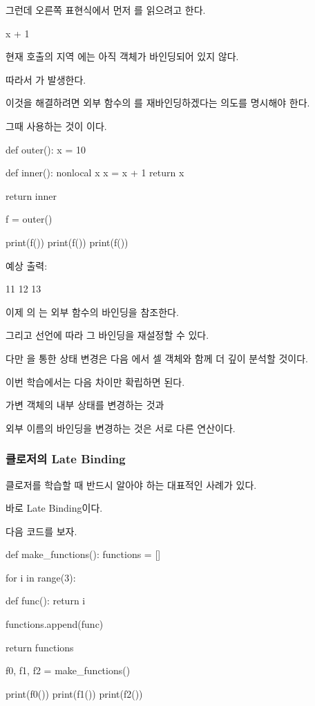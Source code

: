 그런데 오른쪽 표현식에서 먼저 를 읽으려고 한다.

\begin{dhkcode}
x + 1
\end{dhkcode}

현재  호출의 지역 에는 아직 객체가 바인딩되어 있지 않다.

따라서 가 발생한다.

이것을 해결하려면 외부 함수의 를 재바인딩하겠다는 의도를 명시해야 한다.

그때 사용하는 것이 이다.

\begin{dhkcode}
def outer():
    x = 10

    def inner():
        nonlocal x
        x = x + 1
        return x

    return inner


f = outer()

print(f())
print(f())
print(f())
\end{dhkcode}

예상 출력:

\begin{dhkzsh}
11
12
13
\end{dhkzsh}

이제 의 는 외부 함수의 바인딩을 참조한다.

그리고  선언에 따라 그 바인딩을 재설정할 수 있다.

다만 을 통한 상태 변경은 다음 에서 셀 객체와 함께 더 깊이 분석할 것이다.

이번 학습에서는 다음 차이만 확립하면 된다.

\begin{dhksmry}[centered]
가변 객체의 내부 상태를 변경하는 것과 

외부 이름의 바인딩을 변경하는 것은 서로 다른 연산이다.
\end{dhksmry}

\subsubsection{클로저의 Late Binding}

클로저를 학습할 때 반드시 알아야 하는 대표적인 사례가 있다.

바로 Late Binding이다.

다음 코드를 보자.

\begin{dhkcode}
def make_functions():
    functions = []

    for i in range(3):

        def func():
            return i

        functions.append(func)

    return functions


f0, f1, f2 = make_functions()

print(f0())
print(f1())
print(f2())
\end{dhkcode}

